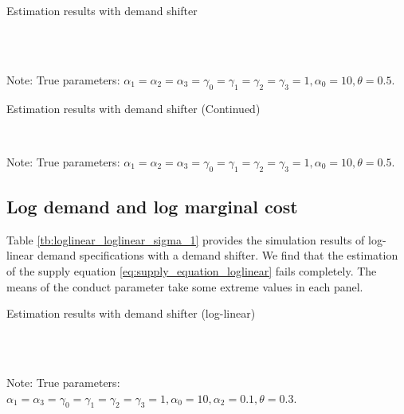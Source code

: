 \documentclass[11pt, a4paper]{article}
\begin{document}
\begin{table}[!htbp]
  \begin{center}
      \caption{Estimation results with demand shifter}
      \label{tb:linear_linear_sigma_1} 
      \subfloat[$\sigma=0.001$]{}\\
      \subfloat[$\sigma=0.5$]{}\\
  \end{center}\footnotesize
  Note: True parameters: $\alpha_1 = \alpha_2 = \alpha_3 = \gamma_0 = \gamma_1 = \gamma_2  = \gamma_3 = 1, \alpha_0 = 10, \theta = 0.5.$
\end{table} 

\begin{table}[!htbp]
  \ContinuedFloat  %
  \begin{center}
      \caption{Estimation results with demand shifter (Continued)}
      \label{tb:linear_linear_sigma_1} 
      \subfloat[$\sigma=1.0$]{}\\
    \subfloat[$\sigma=2.0$]{}
  \end{center}\footnotesize
  Note: True parameters: $\alpha_1 = \alpha_2 = \alpha_3 = \gamma_0 = \gamma_1 = \gamma_2  = \gamma_3 = 1, \alpha_0 = 10, \theta = 0.5.$
\end{table} 


\subsection{Log demand and log marginal cost}
Table \ref{tb:loglinear_loglinear_sigma_1} provides the simulation results of log-linear demand specifications with a demand shifter. 
We find that the estimation of the supply equation \eqref{eq:supply_equation_loglinear} fails completely.
The means of the conduct parameter take some extreme values in each panel.


\begin{table}[!htbp]
  \begin{center}
      \caption{Estimation results with demand shifter (log-linear)}
      \label{tb:loglinear_loglinear_sigma_1} 
      \subfloat[$\sigma=0.001$]{}\\
      \subfloat[$\sigma=0.5$]{}\\
  \end{center}\footnotesize
  Note: True parameters: $\alpha_1 = \alpha_3 = \gamma_0 = \gamma_1 = \gamma_2  = \gamma_3 = 1, \alpha_0 = 10, \alpha_2 = 0.1,  \theta = 0.3.$
\end{table} 
\end{document}
